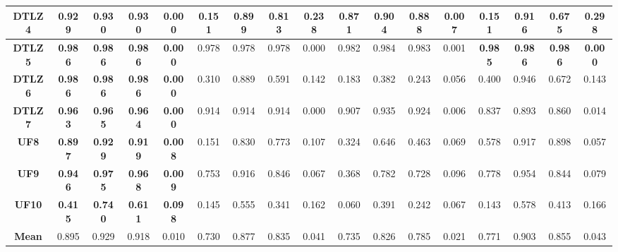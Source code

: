 \begin{table*}[t]
{\begin{tabular}{cc|c|c|c|c|c|c|c|c|c|c|c|c|c|c|c}
\multicolumn{1}{c|}{\textbf{DTLZ4}} & \textbf{0.929} & \textbf{0.930} & \textbf{0.930} & \textbf{0.000} & 0.151          & 0.899          & 0.813          & 0.238          & 0.871        & 0.904        & 0.888         & 0.007        & 0.151          & 0.916          & 0.675          & 0.298           \\ \hline
\multicolumn{1}{c|}{\textbf{DTLZ5}} & \textbf{0.986} & \textbf{0.986} & \textbf{0.986} & \textbf{0.000} & 0.978          & 0.978          & 0.978          & 0.000          & 0.982        & 0.984        & 0.983         & 0.001        & \textbf{0.985} & \textbf{0.986} & \textbf{0.986} & \textbf{0.000}  \\ \hline
\multicolumn{1}{c|}{\textbf{DTLZ6}} & \textbf{0.986} & \textbf{0.986} & \textbf{0.986} & \textbf{0.000} & 0.310          & 0.889          & 0.591          & 0.142          & 0.183        & 0.382        & 0.243         & 0.056        & 0.400          & 0.946          & 0.672          & 0.143           \\ \hline
\multicolumn{1}{c|}{\textbf{DTLZ7}} & \textbf{0.963} & \textbf{0.965} & \textbf{0.964} & \textbf{0.000} & 0.914          & 0.914          & 0.914          & 0.000          & 0.907        & 0.935        & 0.924         & 0.006        & 0.837          & 0.893          & 0.860          & 0.014           \\ \hline
\multicolumn{1}{c|}{\textbf{UF8}}   & \textbf{0.897} & \textbf{0.929} & \textbf{0.919} & \textbf{0.008} & 0.151          & 0.830          & 0.773          & 0.107          & 0.324        & 0.646        & 0.463         & 0.069        & 0.578          & 0.917          & 0.898          & 0.057           \\ \hline
\multicolumn{1}{c|}{\textbf{UF9}}   & \textbf{0.946} & \textbf{0.975} & \textbf{0.968} & \textbf{0.009} & 0.753          & 0.916          & 0.846          & 0.067          & 0.368        & 0.782        & 0.728         & 0.096        & 0.778          & 0.954          & 0.844          & 0.079           \\ \hline
\multicolumn{1}{c|}{\textbf{UF10}}  & \textbf{0.415} & \textbf{0.740} & \textbf{0.611} & \textbf{0.098} & 0.145          & 0.555          & 0.341          & 0.162          & 0.060        & 0.391        & 0.242         & 0.067        & 0.143          & 0.578          & 0.413          & 0.166           \\ \hline
\multicolumn{1}{c|}{\textbf{Mean}}  & 0.895          & 0.929          & 0.918          & 0.010          & 0.730          & 0.877          & 0.835          & 0.041          & 0.735        & 0.826        & 0.785         & 0.021        & 0.771          & 0.903          & 0.855          & 0.043           \\ \hline
\end{tabular}%
}
\end{table*}




